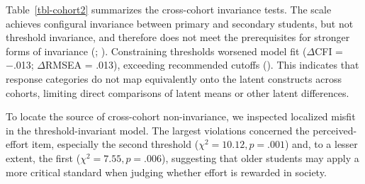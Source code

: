 \documentclass[
  13pt,
]{article}
\begin{document}
\begin{table}

\caption{\label{tbl-cohort2}Cohort (multigroup) invariance results}


\end{table}%

Table~\ref{tbl-cohort2} summarizes the cross-cohort invariance tests.
The scale achieves configural invariance between primary and secondary
students, but not threshold invariance, and therefore does not meet the
prerequisites for stronger forms of invariance
(;
).
Constraining thresholds worsened model fit (\(\Delta\)CFI = −.013;
\(\Delta\)RMSEA = .013), exceeding recommended cutoffs
(). This indicates that
response categories do not map equivalently onto the latent constructs
across cohorts, limiting direct comparisons of latent means or other
latent differences.

To locate the source of cross-cohort non-invariance, we inspected
localized misfit in the threshold-invariant model. The largest
violations concerned the perceived-effort item, especially the second
threshold (\(\chi^2=10.12, p=.001\)) and, to a lesser extent, the first
(\(\chi^2=7.55, p=.006\)), suggesting that older students may apply a
more critical standard when judging whether effort is rewarded in
society.
\end{document}
